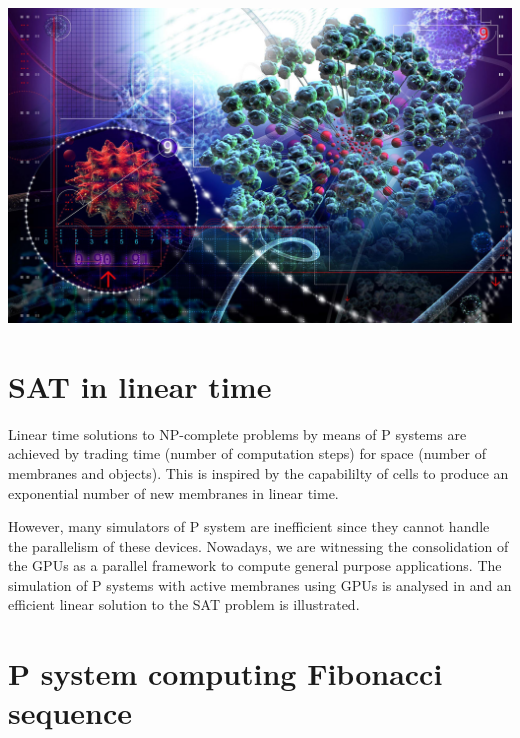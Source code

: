 \documentclass[myposter,portrait]{sciposter}
\def\mysection#1{
{\color{sectionCol}\section*{\sc\bfseries #1}}}
\begin{document}
\begin{multicols*}{3}
\includegraphics[width=\columnwidth]{wallpaper}

\mysection{SAT in linear time}

Linear time solutions to NP-complete problems by means of P systems are achieved by trading time (number of computation steps) for space (number of membranes and objects). This is inspired by the capabililty of cells to produce an exponential number of new membranes in linear time.

However, many simulators of P system are inefficient since they cannot handle the parallelism of these devices. Nowadays, we are witnessing the consolidation of the GPUs as a parallel framework to compute general purpose applications. The simulation of P systems with active membranes using GPUs is analysed in \cite{Cecilia10} and an efficient linear solution to the SAT problem is illustrated.

\mysection{P system computing Fibonacci sequence}

\vspace{10mm}
\end{multicols*}
\end{document}
